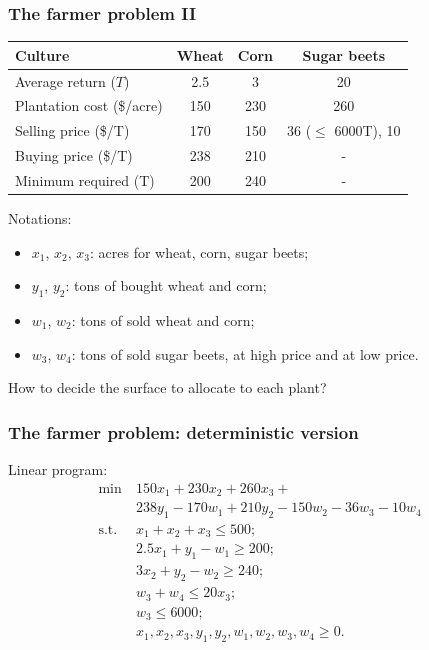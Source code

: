 \documentclass{beamer}
\begin{document}
\begin{frame}
\frametitle{The farmer problem II}

\begin{center}
\begin{tabular}{lccc}
\hline
Culture & Wheat & Corn & Sugar beets \\
\hline
Average return ($T$) & 2.5 & 3 & 20 \\
Plantation cost (\$/acre) & 150 & 230 & 260 \\
Selling price (\$/T) & 170 & 150 & 36 ($\leq$ 6000T), 10 \\
Buying price (\$/T) & 238 & 210 & - \\
Minimum required (T) & 200 & 240 & - \\
\hline
\end{tabular}
\end{center}

\mbox{}

Notations:
\begin{itemize}
\item
$x_1$, $x_2$, $x_3$: acres for wheat, corn, sugar beets;
\item
$y_1$, $y_2$: tons of bought wheat and corn;
\item
$w_1$, $w_2$: tons of sold wheat and corn;
\item
$w_3$, $w_4$: tons of sold sugar beets, at high price and at low price.
\end{itemize}

\mbox{}

How to decide the surface to allocate to each plant?

\end{frame}

\begin{frame}
\frametitle{The farmer problem: deterministic version}

Linear program:
\begin{align*}
\min\ & 150x_1 + 230x_2 + 260x_3 +\\
&  238y_1 - 170w_1 + 210y_2 - 150w_2 -36w_3 - 10w_4 \\
\text{s.t. } & x_1 + x_2 + x_3 \leq 500; \\
& 2.5x_1 + y_1 - w_1 \geq 200; \\
& 3x_2 + y_2 - w_2 \geq 240; \\
& w_3 + w_4 \leq 20 x_3; \\
& w_3 \leq 6000; \\
& x_1, x_2, x_3, y_1, y_2, w_1, w_2, w_3, w_4 \geq 0.
\end{align*}

\end{frame}
\end{document}
